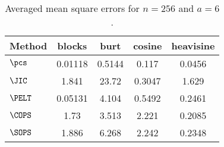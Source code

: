 \begin{table}[ht]
\centering
\begin{tabular}{lcccc}
  \hline
Method & blocks & burt & cosine & heavisine \\ 
  \hline
$\pcs$ & 0.01118 & 0.5144 & 0.117 & 0.0456 \\ 
  $\JIC$ & 1.841 & 23.72 & 0.3047 & 1.629 \\ 
  $\PELT$ & 0.05131 & 4.104 & 0.5492 & 0.2461 \\ 
  $\COPS$ &  1.73 & 3.513 & 2.221 & 0.2085 \\ 
  $\SOPS$ & 1.886 & 6.268 & 2.242 & 0.2348 \\ 
   \hline
\end{tabular}
\caption{Averaged mean square errors for $n = 256$ and $a = 6$.} 
\label{tab:aMSEn256a6}
\end{table}
